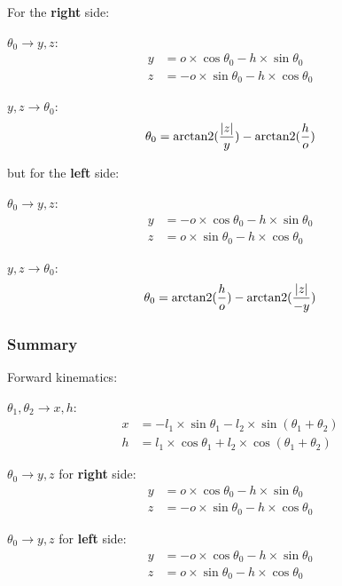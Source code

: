 For the \textbf{right} side:

\indent\indent
$\theta_0 \rightarrow y, z$:
\begin{align*}
y &=  o \times \cos\theta_0 - h \times \sin\theta_0 \\
z &= -o \times \sin\theta_0 - h \times \cos\theta_0
\end{align*}

\indent\indent
$y, z \rightarrow \theta_0$:
\begin{equation*}
   \theta_0 = \operatorname{arctan2}(\frac{\lvert z \lvert}{y}) - \operatorname{arctan2}(\frac{h}{o})
\end{equation*}

but for the \textbf{left} side:

\indent\indent
$\theta_0 \rightarrow y, z$:
\begin{align*}
y &= -o \times \cos\theta_0 - h \times \sin\theta_0 \\
z &=  o \times \sin\theta_0 - h \times \cos\theta_0
\end{align*}

\indent\indent
$y, z \rightarrow \theta_0$:
\begin{equation*}
   \theta_0 = \operatorname{arctan2}(\frac{h}{o}) - \operatorname{arctan2}(\frac{\lvert z \lvert}{-y})
\end{equation*}

\subsubsection{Summary}

\noindent
Forward kinematics:

$\theta_1, \theta_2 \rightarrow x, h$:
\begin{align}
x &= -l_1 \times \sin\theta_1 - l_2 \times \sin(\theta_1 + \theta_2) \\
h &=  l_1 \times \cos\theta_1 + l_2 \times \cos(\theta_1 + \theta_2)
\end{align}

$\theta_0 \rightarrow y, z$ for \textbf{right} side:
\begin{align}
y &=  o \times \cos\theta_0 - h \times \sin\theta_0 \\
z &= -o \times \sin\theta_0 - h \times \cos\theta_0
\end{align}

$\theta_0 \rightarrow y, z$ for \textbf{left} side:
\begin{align}
y &= -o \times \cos\theta_0 - h \times \sin\theta_0 \\
z &=  o \times \sin\theta_0 - h \times \cos\theta_0
\end{align}

